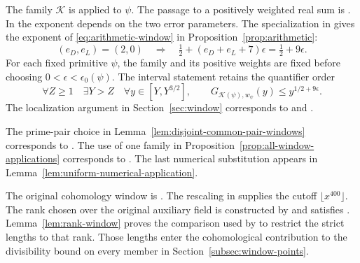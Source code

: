 The family \(\mathcal K\) is  applied to \(\psi\).
The passage to a positively weighted real sum is .
In  the exponent depends on the two error
parameters. The specialization in  gives the exponent
of \eqref{eq:arithmetic-window} in Proposition~\ref{prop:arithmetic}:
\[
 (e_D,e_L)=(2,0)\quad\Longrightarrow\quad
 \tfrac12+(e_D+e_L+7)\epsilon=\tfrac12+9\epsilon .
\]
For each fixed primitive \(\psi\), the family and its positive weights
are fixed before choosing \(0<\epsilon<\epsilon_0(\psi)\).
The interval statement retains the quantifier order
\[
   \forall Z\ge1\quad\exists Y>Z\quad\forall y\in[Y,Y^{3/2}],
       \qquad G_{\mathcal K(\psi),w_\psi}(y)\le y^{1/2+9\epsilon}.
\]
The localization argument in Section~\ref{sec:window}
corresponds to  and
. \cite{release}

The prime-pair choice in Lemma~\ref{lem:disjoint-common-pair-windows}
corresponds to \href{https://github.com/Deicyde/riemann-hypothesis/blob/a172c464fd4bcfc4f53e394dcba45d742b1409a6/src/Development/AutomorphicArithmetic/CharacterBoxes/WinPairs.lean}{}.
The use of one family in Proposition~\ref{prop:all-window-applications}
corresponds to \href{https://github.com/Deicyde/riemann-hypothesis/blob/a172c464fd4bcfc4f53e394dcba45d742b1409a6/src/Development/AutomorphicArithmetic/CharacterBoxes/DesWin.lean}{}.
The last numerical substitution appears in Lemma~\ref{lem:uniform-numerical-application}.

The original cohomology window is . The rescaling in
 supplies the cutoff \(\lfloor x^{400}\rfloor\).
The rank chosen over the original auxiliary field is constructed by
 and satisfies .
Lemma~\ref{lem:rank-window} proves the comparison used by
 to restrict the strict lengths to that rank.
Those lengths enter the cohomological contribution to the divisibility bound on every member in
Section~\ref{subsec:window-points}. \cite{release-host-to-numerator}

